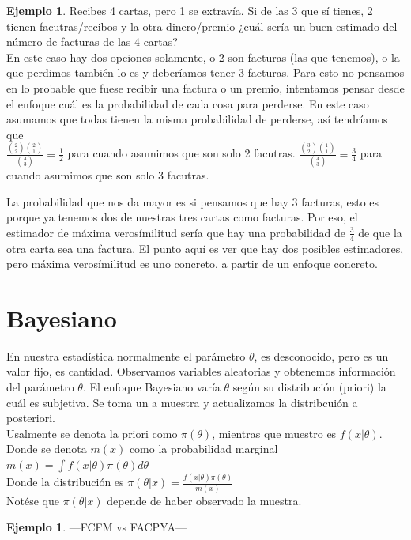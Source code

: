 \documentclass[11pt,a4paper,oneside]{report}
\theoremstyle{definition}
\newtheorem{ejemplo}[definicion]{Ejemplo}
\theoremstyle{plain}
\theoremstyle{remark}
\begin{document}
\begin{ejemplo}
  Recibes 4 cartas, pero 1 se extravía. Si de las 3 que sí tienes, 2 tienen facutras/recibos y la otra dinero/premio
  ¿cuál sería un buen estimado del número de facturas de las 4 cartas? \\
  En este caso hay dos opciones solamente, o 2 son facturas (las que tenemos), o la que perdimos también lo es y deberíamos 
  tener 3 facturas. Para esto no pensamos en lo probable que fuese recibir una factura o un premio, intentamos pensar desde
  el enfoque cuál es la probabilidad de cada cosa para perderse. En este caso asumamos que todas tienen la misma probabilidad de 
  perderse, así tendríamos que\\
  $\frac{\binom{2}{2} \binom{2}{1}}{\binom{4}{3}}=\frac{1}{2}$ para cuando asumimos que son solo 2 facutras.
  $\frac{\binom{3}{2} \binom{1}{1}}{\binom{4}{3}}=\frac{3}{4}$ para cuando asumimos que son solo 3 facutras.
\end{ejemplo}
  La probabilidad que nos da mayor es si pensamos que hay 3 facturas, esto es porque ya tenemos dos de nuestras tres cartas 
  como facturas. Por eso, el estimador de máxima verosímilitud sería que hay una probabilidad de $\frac{3}{4}$ de que la otra carta
  sea una factura. El punto aquí es ver que hay dos posibles estimadores, pero máxima verosímilitud es uno concreto, a partir de un 
  enfoque concreto. 


\section{Bayesiano}
En nuestra estadística normalmente el parámetro $\theta$, es desconocido, pero es un valor fijo, es cantidad. Observamos variables aleatorias
y obtenemos información del parámetro $\theta$. El enfoque Bayesiano varía $\theta$ según su distribución (priori) la cuál es subjetiva.
Se toma un a muestra y actualizamos la distribcuión a posteriori. \\
Usalmente se denota la priori como $\pi(\theta)$, mientras que muestro es 
$f(x|\theta)$. Donde se denota $m(x)$ como la probabilidad marginal\\
$m(x)=\int f(x|\theta)\pi(\theta)d\theta$\\
Donde la distribución es $\pi(\theta | x)=\frac{f(x|\theta)\pi(\theta)}{m(x)}$\\
Notése que $\pi(\theta|x)$ depende de haber observado la muestra.

\begin{ejemplo}
  ---FCFM vs FACPYA---
\end{ejemplo}
\end{document}
